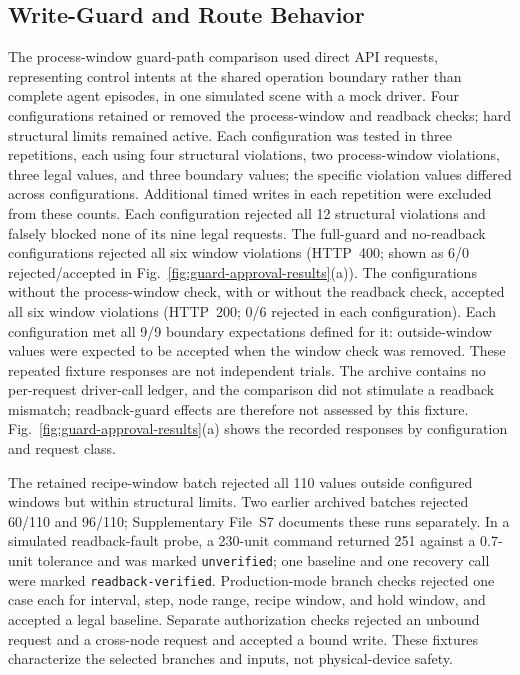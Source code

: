 \subsection{Write-Guard and Route Behavior}
\label{sec:eval-ablation}
The process-window guard-path comparison used direct API requests, representing control intents at the shared operation boundary rather than complete agent episodes, in one simulated scene with a mock driver. Four configurations retained or removed the process-window and readback checks; hard structural limits remained active. Each configuration was tested in three repetitions, each using four structural violations, two process-window violations, three legal values, and three boundary values; the specific violation values differed across configurations. Additional timed writes in each repetition were excluded from these counts. Each configuration rejected all 12 structural violations and falsely blocked none of its nine legal requests. The full-guard and no-readback configurations rejected all six window violations (HTTP~400; shown as 6/0 rejected/accepted in Fig.~\ref{fig:guard-approval-results}(a)). The configurations without the process-window check, with or without the readback check, accepted all six window violations (HTTP~200; 0/6 rejected in each configuration). Each configuration met all 9/9 boundary expectations defined for it: outside-window values were expected to be accepted when the window check was removed. These repeated fixture responses are not independent trials. The archive contains no per-request driver-call ledger, and the comparison did not stimulate a readback mismatch; readback-guard effects are therefore not assessed by this fixture. Fig.~\ref{fig:guard-approval-results}(a) shows the recorded responses by configuration and request class.

The retained recipe-window batch rejected all 110 values outside configured windows but within structural limits. Two earlier archived batches rejected 60/110 and 96/110; Supplementary File~S7 documents these runs separately. In a simulated readback-fault probe, a 230-unit command returned 251 against a 0.7-unit tolerance and was marked \texttt{unverified}; one baseline and one recovery call were marked \texttt{readback-verified}. Production-mode branch checks rejected one case each for interval, step, node range, recipe window, and hold window, and accepted a legal baseline. Separate authorization checks rejected an unbound request and a cross-node request and accepted a bound write. These fixtures characterize the selected branches and inputs, not physical-device safety.

